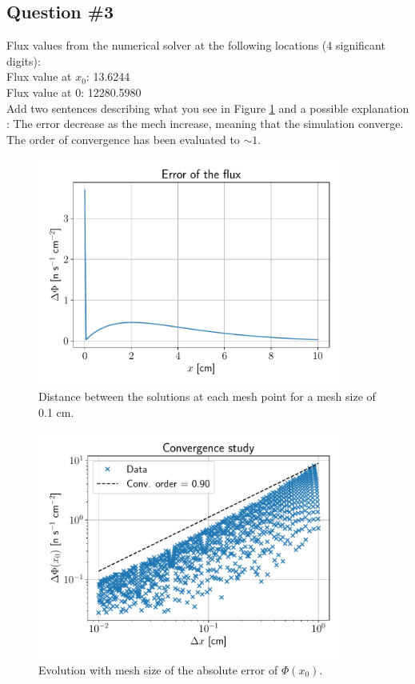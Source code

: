 \documentclass[11pt,a4paper]{article}
\begin{document}
\subsection{Question \#3}

Flux values from the numerical solver at the following locations (4 significant digits):\\
Flux value at $x_0$: 13.6244 \\
Flux value at $0$: 12280.5980 \\

Add two sentences describing what you see in Figure \ref{err} and a possible explanation :
The error decrease as the mech increase, meaning that the simulation converge. The order of convergence has been evaluated to $\sim  1$. 

\begin{figure}[H]
	\includegraphics[width=10cm]{fig/Ex1_Error.pdf}
	\centering
	\caption{Distance between the solutions at each mesh point for a mesh size of 0.1 cm.}
\end{figure}

\begin{figure}[H]
\includegraphics[width=10cm]{fig/Ex1_conv_N1000.pdf}
\centering
\caption{Evolution with mesh size of the absolute error of $\Phi(x_0)$.}
\label{err}
\end{figure}
\end{document}
